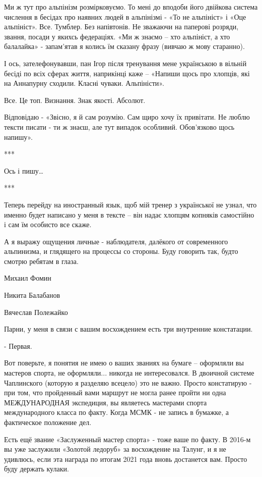 Ми ж тут про альпінізм розмірковуємо. То мені до вподоби його двійкова система
числення в бесідах про наявних людей в альпінізмі - «То не альпініст» і «Оце
альпініст». Все. Тумблер. Без напівтонів. Не зважаючи на паперові розряди,
звання, посади у якихсь федераціях. «Ми ж знаємо – хто альпініст, а хто
балалайка» - запам’ятав я колись їм сказану фразу (вивчаю ж мову старанно). 

І ось, зателефонувавши, пан Ігор після тренування мене українською в вільній
бесіді по всіх сферах життя, наприкінці каже – «Напиши щось про хлопців, які на
Аннапурну сходили. Класні чуваки. Альпіністи».

Все. Це топ. Визнання. Знак якості. Абсолют.

Відповідаю - «Звісно, я й сам розумію. Сам щиро хочу їх привітати. Не люблю
тексти писати - ти ж знаєш, але тут випадок особливий. Обов’язково щось
напишу».

***

Ось і пишу…

***

Теперь перейду на иностранный язык, щоб мій тренер з української не узнал, что
именно будет написано у меня в тексте – він надає хлопцям копняків самостійно і
сам їм особисто все скаже.

А я выражу ощущения личные - наблюдателя, далёкого от современного альпинизма,
и глядящего на процессы со стороны. Буду говорить так, будто смотрю ребятам в
глаза.

Михаил Фомин

Никита Балабанов

Вячеслав Полежайко

Парни, у меня в связи с вашим восхождением есть три внутренние констатации.

- Первая.

Вот поверьте, я понятия не имею о ваших званиях на бумаге – оформляли вы
мастеров спорта, не оформляли... никогда не интересовался. В двоичной системе
Чаплинского (которую я разделяю всецело) это не важно. Просто констатирую - при
том, что пройденный вами маршрут не могла ранее пройти ни одна МЕЖДУНАРОДНАЯ
экспедиция, вы являетесь мастерами спорта международного класса по факту. Когда
МСМК - не запись в бумажке, а фактическое положение дел.

Есть ещё звание «Заслуженный мастер спорта» - тоже ваше по факту. В 2016-м вы
уже заслужили «Золотой ледоруб» за восхождение на Талунг, и я не удивлюсь, если
эта награда по итогам 2021 года вновь достанется вам. Просто буду держать
кулаки.

